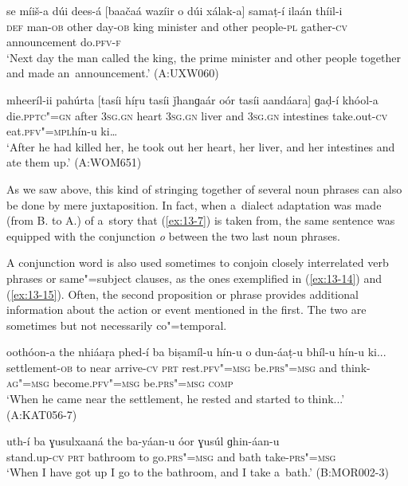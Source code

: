 \begin{exe}
\ex
\label{ex:13-12}
\gll se míiš-a dúi dees-á [baačaá wazíir o dúi xálak-a] samaṭ-í ilaán thíil-i \\
\textsc{def} man-\textsc{ob} other day-\textsc{ob} king minister and other  people-\textsc{pl} gather-\textsc{cv} announcement do.\textsc{pfv-f}  \\
\glt `Next day the man called the king, the prime minister and other people together and made an~announcement.' (A:UXW060)

\ex
\label{ex:13-13}
\gll mheeríl-ii pahúrta [tasíi híṛu tasíi ǰhanɡaár oór tasíi aandáara] ɡaḍ-í khóol-a  \\
die.\textsc{pptc"=gn} after \textsc{3sg.gn} heart \textsc{3sg.gn}  liver and \textsc{3sg.gn} intestines take.out-\textsc{cv} eat.\textsc{pfv"=mpl}hín-u ki{\ldots} \\
\glt `After he had killed her, he took out her heart, her liver, and her intestines and ate them up.' (A:WOM651) 
\end{exe}

As we saw above, this kind of stringing together of several noun phrases can also be done by mere juxtaposition. In fact, when a~dialect adaptation was made (from B. to A.) of a~story that (\ref{ex:13-7}) is taken from, the same sentence was equipped with the conjunction \textit{o} between the two last noun phrases. 


A conjunction word is also used sometimes to conjoin closely interrelated verb phrases or same"=subject clauses, as the ones exemplified in (\ref{ex:13-14}) and (\ref{ex:13-15}). Often, the second proposition or phrase provides additional information about the action or event mentioned in the first. The two are sometimes but not necessarily co"=temporal.

\begin{exe}
\ex
\label{ex:13-14}
\gll oothóon-a the nhiáaṛa phed-í ba biṣamíl-u hín-u o dun-áaṭ-u bhíl-u hín-u ki...\\
settlement-\textsc{ob} to near arrive-\textsc{cv} \textsc{prt} rest.\textsc{pfv"=msg} be.\textsc{prs"=msg} and think-\textsc{ag"=msg} become.\textsc{pfv"=msg} be.\textsc{prs"=msg } \textsc{comp} \\
\glt `When he came near the settlement, he rested and started to think...' (A:KAT056-7)

\ex
\label{ex:13-15}
\gll uth-í ba ɣusulxaaná the ba-yáan-u óor ɣusúl ɡhin-áan-u \\
stand.up-\textsc{cv} \textsc{prt} bathroom to go.\textsc{prs"=msg}  and bath take-\textsc{prs"=msg} \\
\glt `When I have got up I go to the bathroom, and I take a~bath.' (B:MOR002-3) 
\end{exe}

